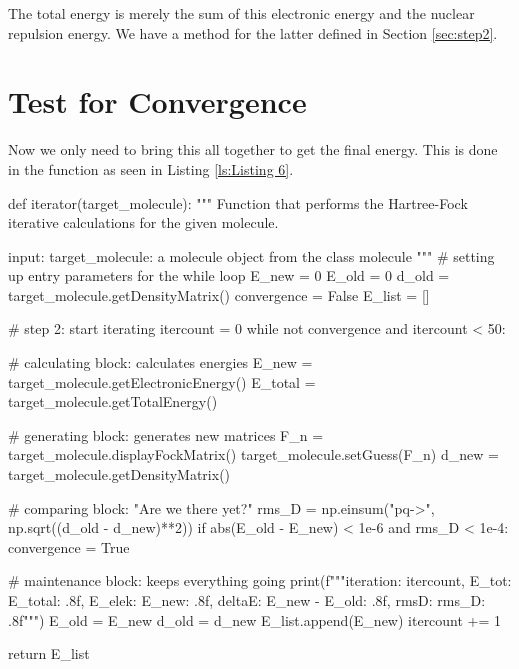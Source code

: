The total energy is merely the sum of this electronic energy and the nuclear 
repulsion energy. We have a method for the latter defined in Section 
\ref{sec:step2}.
 
 \section{Test for Convergence}
 \label{sec:step6}
Now we only need to bring this all together to get the final energy. 
This is done in the function  as seen in Listing 
\ref{ls:Listing 6}.

 
   
\begin{python}[caption={iteration sequence},label={ls:Listing 6}]
    def iterator(target_molecule):
        """
        Function that performs the Hartree-Fock iterative calculations 
        for the given molecule.
        
        input:
        target_molecule: a molecule object from the class molecule
        """
        # setting up entry parameters for the while loop
        E_new = 0  
        E_old = 0
        d_old = target_molecule.getDensityMatrix()
        convergence = False
        E_list = []

        # step 2: start iterating
        itercount = 0
        while not convergence and itercount < 50:

            # calculating block: calculates energies
            E_new = target_molecule.getElectronicEnergy()
            E_total = target_molecule.getTotalEnergy()

            # generating block: generates new matrices
            F_n =  target_molecule.displayFockMatrix()
            target_molecule.setGuess(F_n)
            d_new = target_molecule.getDensityMatrix()

            # comparing block: "Are we there yet?"
            rms_D = np.einsum("pq->", np.sqrt((d_old - d_new)**2))
            if abs(E_old - E_new) < 1e-6 and rms_D < 1e-4:
                convergence = True


            # maintenance block: keeps everything going
            print(f"""iteration: {itercount}, E_tot: {E_total: .8f}, 
                        E_elek: {E_new: .8f}, 
                        deltaE: {E_new - E_old: .8f}, 
                        rmsD: {rms_D: .8f}""")
            E_old = E_new
            d_old = d_new
            E_list.append(E_new)
            itercount += 1
        
        return E_list
\end{python}

